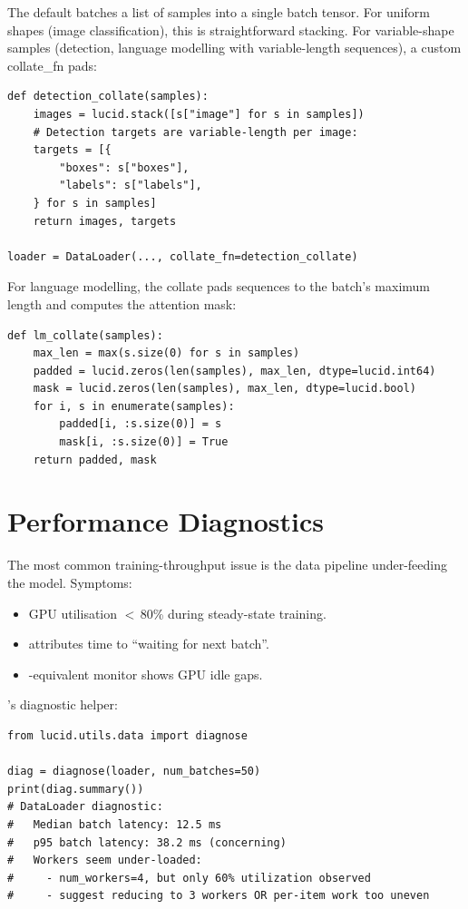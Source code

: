 The default  batches a list of samples into
a single batch tensor. For uniform shapes (image classification),
this is straightforward stacking. For variable-shape samples
(detection, language modelling with variable-length sequences),
a custom collate\_fn pads:

\begin{lstlisting}[style=lucid,language=LucidPython]
def detection_collate(samples):
    images = lucid.stack([s["image"] for s in samples])
    # Detection targets are variable-length per image:
    targets = [{
        "boxes": s["boxes"],
        "labels": s["labels"],
    } for s in samples]
    return images, targets

loader = DataLoader(..., collate_fn=detection_collate)
\end{lstlisting}

For language modelling, the collate pads sequences to the
batch's maximum length and computes the attention mask:

\begin{lstlisting}[style=lucid,language=LucidPython]
def lm_collate(samples):
    max_len = max(s.size(0) for s in samples)
    padded = lucid.zeros(len(samples), max_len, dtype=lucid.int64)
    mask = lucid.zeros(len(samples), max_len, dtype=lucid.bool)
    for i, s in enumerate(samples):
        padded[i, :s.size(0)] = s
        mask[i, :s.size(0)] = True
    return padded, mask
\end{lstlisting}

\section{Performance Diagnostics}
\label{sec:data_pipeline:diagnostics}

The most common training-throughput issue is the data pipeline
under-feeding the model. Symptoms:
\begin{itemize}
  \item GPU utilisation $<$\,80\% during steady-state training.
  \item {} attributes time to ``waiting for
    next batch''.
  \item {}-equivalent monitor shows GPU idle gaps.
\end{itemize}

\Lucid's diagnostic helper:

\begin{lstlisting}[style=lucid,language=LucidPython]
from lucid.utils.data import diagnose

diag = diagnose(loader, num_batches=50)
print(diag.summary())
# DataLoader diagnostic:
#   Median batch latency: 12.5 ms
#   p95 batch latency: 38.2 ms (concerning)
#   Workers seem under-loaded:
#     - num_workers=4, but only 60% utilization observed
#     - suggest reducing to 3 workers OR per-item work too uneven
\end{lstlisting}

